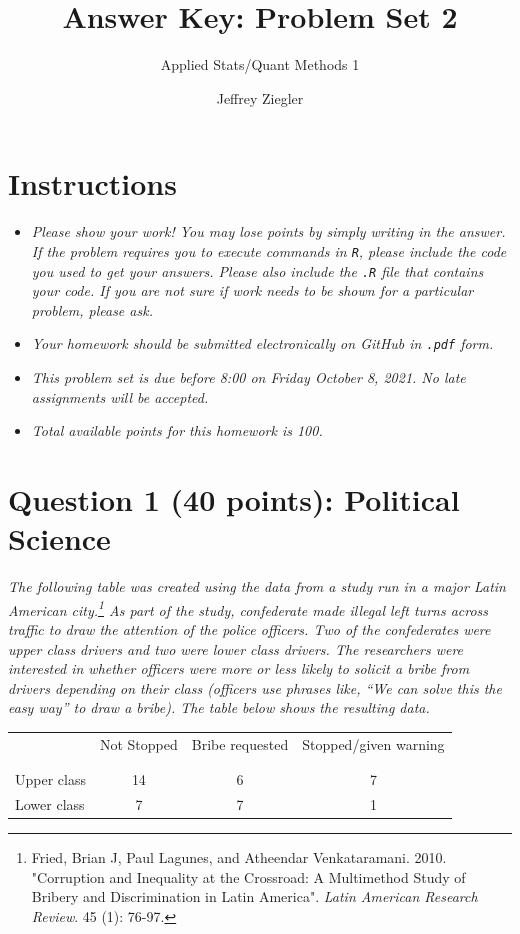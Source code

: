 \documentclass[12pt,letterpaper]{article}
\title{Answer Key: Problem Set 2}
\date{Jeffrey Ziegler}
\author{Applied Stats/Quant Methods 1}
\begin{document}
	\maketitle
	
	\section*{Instructions}
	\begin{itemize}
		\item \textit{Please show your work! You may lose points by simply writing in the answer. If the problem requires you to execute commands in \texttt{R}, please include the code you used to get your answers. Please also include the \texttt{.R} file that contains your code. If you are not sure if work needs to be shown for a particular problem, please ask.}
	\item \textit{Your homework should be submitted electronically on GitHub in \texttt{.pdf} form.}
	\item \textit{This problem set is due before 8:00 on Friday October 8, 2021. No late assignments will be accepted.}
	\item \textit{Total available points for this homework is 100.}
	\end{itemize}
	
	\vspace{.5cm}
	\section*{Question 1 (40 points): Political Science}
		\vspace{.25cm}
\textit{The following table was created using the data from a study run in a major Latin American city.\footnote{Fried, Brian J, Paul Lagunes, and Atheendar Venkataramani. 2010. "Corruption and Inequality at the Crossroad: A Multimethod Study of Bribery and Discrimination in Latin America". \textit{Latin American Research Review}. 45 (1): 76-97.} As part of the study, confederate made illegal left turns across traffic to draw the attention of the police officers.  Two of the confederates were upper class drivers and two were lower class drivers.  The researchers were interested in whether officers were more or less likely to solicit a bribe from drivers depending on their class (officers use phrases like, ``We can solve this the easy way'' to draw a bribe).  The table below shows the resulting data.}

\begin{table}[h!]
	\centering
	\begin{adjustbox}{max width=.75\textwidth}
		\begin{tabular}{l | c c c }
			& Not Stopped & Bribe requested & Stopped/given warning \\
			\\[-1.8ex] 
			\hline \\[-1.8ex]
			Upper class & 14 & 6 & 7 \\
			Lower class & 7 & 7 & 1 \\
			\hline
		\end{tabular}
	\end{adjustbox}
\end{table}
\end{document}
